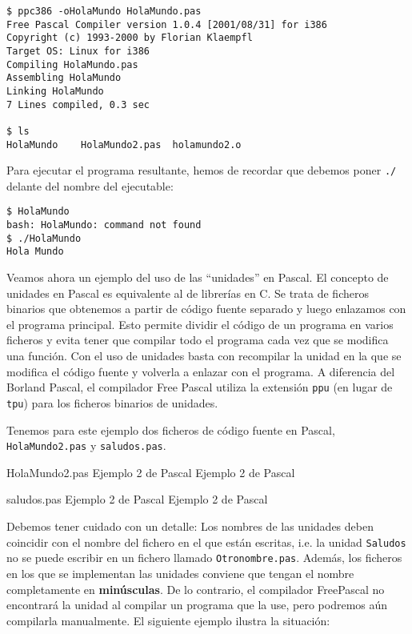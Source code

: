 \begin{verbatim}
$ ppc386 -oHolaMundo HolaMundo.pas
Free Pascal Compiler version 1.0.4 [2001/08/31] for i386
Copyright (c) 1993-2000 by Florian Klaempfl
Target OS: Linux for i386
Compiling HolaMundo.pas
Assembling HolaMundo
Linking HolaMundo
7 Lines compiled, 0.3 sec

$ ls
HolaMundo    HolaMundo2.pas  holamundo2.o
\end{verbatim}

Para ejecutar  el programa resultante,  hemos de recordar  que debemos
poner {\tt ./} delante del nombre del ejecutable:

\begin{verbatim}
$ HolaMundo
bash: HolaMundo: command not found
$ ./HolaMundo
Hola Mundo
\end{verbatim}

Veamos ahora  un ejemplo  del uso  de las  ``unidades'' en  Pascal. El
concepto de unidades en Pascal es equivalente al de librerías en C. Se
trata de  ficheros binarios  que obtenemos a  partir de  código fuente
separado y  luego enlazamos  con el  programa principal.  Esto permite
dividir el código de un programa  en varios ficheros y evita tener que
compilar todo el programa cada vez que se modifica una función. Con el
uso de unidades  basta con recompilar la unidad en  la que se modifica
el código  fuente y volverla a  enlazar con el programa.  A diferencia
del Borland  Pascal, el  compilador Free  Pascal utiliza  la extensión
{\tt  ppu} (en  lugar  de {\tt  tpu}) para  los  ficheros binarios  de
unidades.

Tenemos para  este ejemplo  dos ficheros de  código fuente  en Pascal,
{\tt HolaMundo2.pas} y {\tt saludos.pas}.

\begin{ejemplo}{HolaMundo2.pas}%
{Ejemplo 2 de Pascal }
Ejemplo 2 de Pascal 
\end{ejemplo}

\begin{ejemplo}{saludos.pas}%
{Ejemplo 2 de Pascal }
Ejemplo 2 de Pascal 
\end{ejemplo}

Debemos  tener cuidado  con un  detalle: Los  nombres de  las unidades
deben coincidir  con el nombre del  fichero en el que  están escritas,
i.e.  la unidad  {\tt  Saludos} no  se puede  escribir  en un  fichero
llamado  {\tt Otronombre.pas}.  Además,  los ficheros  en  los que  se
implementan las  unidades conviene que tengan  el nombre completamente
en  {\bf minúsculas}.  De lo  contrario, el  compilador FreePascal  no
encontrará la unidad al compilar un programa que la use, pero podremos
aún compilarla manualmente. El siguiente ejemplo ilustra la situación:

